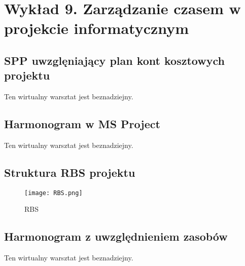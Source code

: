 \chapter{Wykład 9. Zarządzanie czasem w projekcie informatycznym}

\section{SPP uwzglęniający plan kont kosztowych projektu}

Ten wirtualny warsztat jest beznadziejny.


\section{Harmonogram w MS Project}

Ten wirtualny warsztat jest beznadziejny.


\section{Struktura RBS projektu}

\begin{figure}[h]
\begin{center}
\texttt{[image: RBS.png]}
\caption[RBS]{RBS}
\label{rysunekProces}
\end{center}
\end{figure}


\section{Harmonogram z uwzględnieniem zasobów}

Ten wirtualny warsztat jest beznadziejny.


